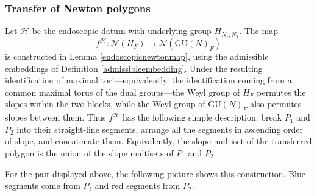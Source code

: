 \documentclass[11pt,a4paper]{article}
\theoremstyle{definition}
\theoremstyle{plain}
\theoremstyle{remark}
\theoremstyle{plain}
\begin{document}
\subsubsection{Transfer of Newton polygons}
Let $\mathcal H$ be the endoscopic datum with underlying group $H_{N_1,N_2}$. The map
$$
f^{\mathcal H}:\mathcal N(H_F)\longrightarrow\mathcal N(\mathrm{GU}(N)_F)
$$
is constructed in Lemma \ref{endoscopicnewtonmap}, using the admissible embeddings of Definition \ref{admissibleembedding}. Under the resulting identification of maximal tori---equivalently, the identification coming from a common maximal torus of the dual groups---the Weyl group of $H_F$ permutes the slopes within the two blocks, while the Weyl group of $\mathrm{GU}(N)_F$ also permutes slopes between them. Thus $f^{\mathcal H}$ has the following simple description: break $P_1$ and $P_2$ into their straight-line segments, arrange all the segments in ascending order of slope, and concatenate them. Equivalently, the slope multiset of the transferred polygon is the union of the slope multisets of $P_1$ and $P_2$.

For the pair displayed above, the following picture shows this construction. Blue segments come from $P_1$ and red segments from $P_2$.
\end{document}

